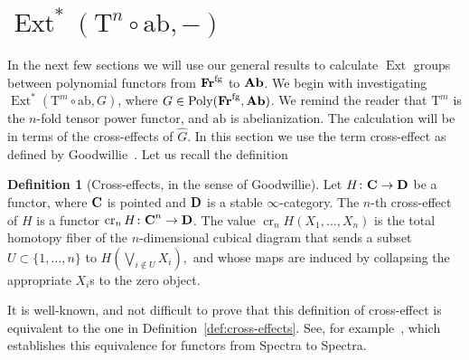 \documentclass[psamsfonts]{amsart}
\theoremstyle{plain}
\theoremstyle{definition}
\newtheorem{defn}[thm]{Definition}
\theoremstyle{remark}
\newtheorem{rem}[thm]{Remark}
\newcommand{\catname}[1]{{\normalfont\textbf{#1}}}
\newcommand{\fr}{\allfr^{\mathrm{fg}}}
\newcommand{\allfr}{\catname{Fr}}
\newcommand{\ab}{\catname{Ab}}
\newcommand{\aut}{\operatorname{aut}}
\newcommand{\free}[1]{\operatorname{F}\,\langle #1\rangle}
\newcommand{\abelianization}{\mathrm{ab}}
\newcommand{\tensor}{\mathrm{T}}
\DeclareMathOperator{\ext}{Ext}
\DeclareMathOperator{\poly}{Poly}
\DeclareMathOperator{\ce}{cr}
\begin{document}
\section{$\ext^*(\tensor^n\circ \abelianization, -)$}\label{section:ext from tensor}
In the next few sections we will use our general results to calculate $\ext$ groups between polynomial functors from $\fr$ to $\ab$. We begin with investigating $\ext^*(\tensor^m\circ \abelianization, G)$, where $G\in \poly(\fr, \ab)$. We remind the reader that $\tensor^m$ is the $n$-fold tensor power functor, and $\abelianization$ is abelianization. The calculation will be in terms of the cross-effects of $\widehat G$. In this section we use the term cross-effect as defined by Goodwillie~\cite{Goodwillie2003}. Let us recall the definition
\begin{defn}[Cross-effects, in the sense of Goodwillie]
    Let $H\colon \catname{C}\to \catname{D}$ be a functor, where $\catname{C}$ is pointed and $\catname{D}$ is a stable $\infty$-category. The $n$-th cross-effect of $H$ is a functor $\ce_nH\colon \catname{C}^n\to \catname{D}$. The value $\ce_nH(X_1, \ldots, X_n)$ is the total homotopy fiber of the $n$-dimensional cubical diagram that sends a subset $U\subset \{1, \ldots, n\} $ to 
    $H\left(\bigvee_{i\notin U} X_i\right),$ 
    and whose maps are induced by collapsing the appropriate $X_i$s to the zero object.
\end{defn}
It is well-known, and not difficult to prove that this definition of cross-effect is equivalent to the one in Definition~\ref{def:cross-effects}. See, for example~\cite[Lemma 3.29]{Arone-Barthel-Heard-Sanders}, which establishes this equivalence for functors from Spectra to Spectra.
\end{document}
